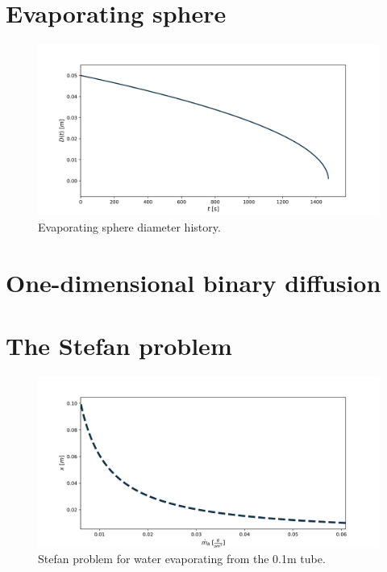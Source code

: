 \documentclass[10pt]{article}
\begin{document}
\newpage

\section{Evaporating sphere}

\begin{figure}[H]
\centering\includegraphics[width=16cm]{Code/evaporating-sphere.png}
\caption{Evaporating sphere diameter history.}
\label{fig:stefan-problem}
\end{figure}

\newpage

\section{One-dimensional binary diffusion}



\newpage

\section{The Stefan problem}

\begin{figure}[H]
\centering\includegraphics[width=16cm]{Code/stefan-problem.png}
\caption{Stefan problem for water evaporating from the 0.1m tube.}
\label{fig:stefan-problem}
\end{figure}
\end{document}
